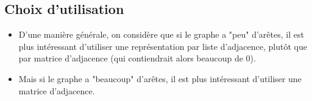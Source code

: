  
\subsection{Choix d'utilisation}
\begin{itemize}
	\item D'une manière générale, on considère que si le graphe a  "peu" d'arêtes, il
	est plus intéressant d'utiliser une représentation par liste d'adjacence, plutôt que par
	matrice d'adjacence (qui contiendrait alors beaucoup de $0$).
	\item Mais si le graphe a "beaucoup" d'arêtes, il est plus intéressant d'utiliser 
	une matrice d'adjacence.
\end{itemize}

